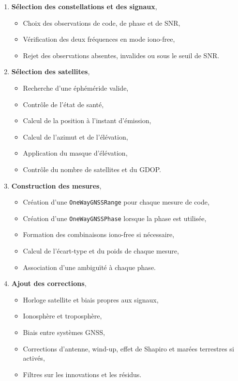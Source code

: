\begin{enumerate}
    \item \textbf{Sélection des constellations et des signaux},
    \begin{itemize}
        \item Choix des observations de code, de phase et de SNR,
        \item Vérification des deux fréquences en mode iono-free,
        \item Rejet des observations absentes, invalides ou sous le seuil de
        SNR.
    \end{itemize}

    \item \textbf{Sélection des satellites},
    \begin{itemize}
        \item Recherche d'une éphéméride valide,
        \item Contrôle de l'état de santé,
        \item Calcul de la position à l'instant d'émission,
        \item Calcul de l'azimut et de l'élévation,
        \item Application du masque d'élévation,
        \item Contrôle du nombre de satellites et du GDOP.
    \end{itemize}

    \item \textbf{Construction des mesures},
    \begin{itemize}
        \item Création d'une \texttt{OneWayGNSSRange} pour chaque mesure de
        code,
        \item Création d'une \texttt{OneWayGNSSPhase} lorsque la phase est
        utilisée,
        \item Formation des combinaisons iono-free si nécessaire,
        \item Calcul de l'écart-type et du poids de chaque mesure,
        \item Association d'une ambiguïté à chaque phase.
    \end{itemize}

    \item \textbf{Ajout des corrections},
    \begin{itemize}
        \item Horloge satellite et biais propres aux signaux,
        \item Ionosphère et troposphère,
        \item Biais entre systèmes GNSS,
        \item Corrections d'antenne, wind-up, effet de Shapiro et marées terrestres si activés,
        \item Filtres sur les innovations et les résidus.
    \end{itemize}


\end{enumerate}
